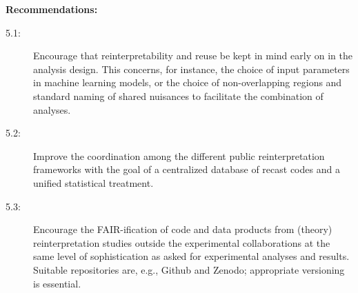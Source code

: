 \documentclass[11pt]{article}
\begin{document}
%
%
%
%

\noindent
\textbf{Recommendations:}
\begin{description}
   \item[5.1:] Encourage that reinterpretability and reuse be kept in mind early on in the analysis design. This concerns, for instance, the choice of input parameters in machine learning models, or the choice of non-overlapping regions and standard naming of shared nuisances to facilitate the combination of analyses.   
   \item[5.2:] Improve the coordination among the different public reinterpretation frameworks  with the goal of a centralized database of recast codes and a unified statistical treatment.
   \item[5.3:] Encourage the FAIR-ification of code and data products from (theory) reinterpretation studies outside the experimental collaborations at the same level of sophistication as asked for experimental analyses and results. Suitable repositories are, e.g., Github and Zenodo; appropriate versioning is essential.
\end{description}
\end{document}
